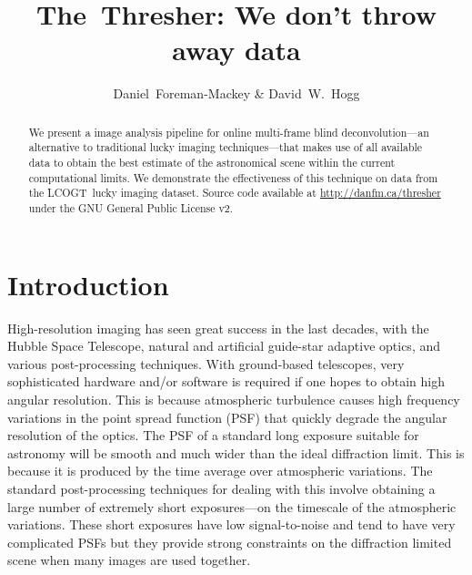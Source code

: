 \documentclass[12pt,preprint]{aastex}
\newcommand{\project}[1]{{\sffamily #1}}
\newcommand{\TheThresher}{\project{The~Thresher}}
\newcommand{\LCOGT}{\project{LCOGT}}
\newcommand{\license}{GNU General Public License v2}
\begin{document}
\title{\TheThresher: We don't throw away data}

\author{%
    Daniel~Foreman-Mackey\altaffilmark{\ref{CCPP},\ref{email}} \&
    David~W.~Hogg\altaffilmark{\ref{CCPP},\ref{MPIA}}
}

\setcounter{address}{1}

\begin{abstract}
    We present a image analysis pipeline for online multi-frame blind
    deconvolution---an alternative to traditional lucky imaging
    techniques---that makes use of all available data to obtain the best
    estimate of the astronomical scene within the current computational
    limits. We demonstrate the effectiveness of this technique on data
    from the \LCOGT\ lucky imaging dataset.
    Source code available at \url{http://danfm.ca/thresher}
    under the \license.
\end{abstract}


\clearpage

\section{Introduction}

High-resolution imaging has seen great success in the last decades,
with the \project{Hubble Space Telescope}, natural and artificial
guide-star adaptive optics, and various post-processing techniques.
With ground-based telescopes, very sophisticated hardware and/or
software is required if one hopes to obtain high angular resolution.
This is because atmospheric turbulence causes high frequency variations
in the point spread function (PSF) that quickly degrade the angular
resolution of the optics. The PSF of a standard long exposure suitable
for astronomy will be smooth and much wider than the ideal diffraction
limit. This is because it is produced by the time average over
atmospheric variations. The standard post-processing techniques for
dealing with this involve obtaining a large number of extremely short
exposures---on the timescale of the atmospheric variations. These
short exposures have low signal-to-noise and tend to have very
complicated PSFs but they provide strong constraints on the
diffraction limited scene when many images are used together.
\end{document}
